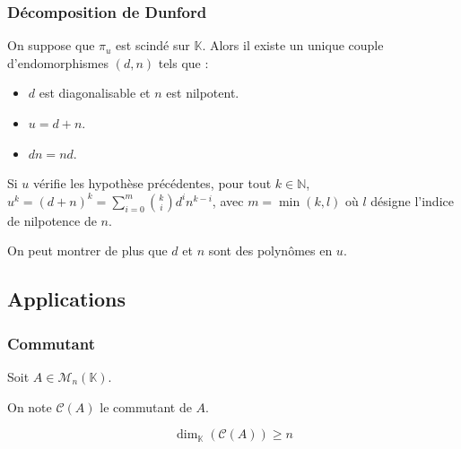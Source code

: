   \subsubsection{Décomposition de Dunford}


  \begin{theorem}
    On suppose que $\pi_u$ est scindé sur $\mathbb{K}$. Alors il existe un unique couple d'endomorphismes $(d, n)$ tels que :
    \begin{itemize}
      \item $d$ est diagonalisable et $n$ est nilpotent.
      \item $u = d + n$.
      \item $d n = n d$.
    \end{itemize}
  \end{theorem}

  \begin{corollary}
    Si $u$ vérifie les hypothèse précédentes, pour tout $k \in \mathbb{N}$, $u^k = (d + n)^k = \sum_{i=0}^m \binom{k}{i} d^i n^{k-i}$, avec $m = \min(k, l)$ où $l$ désigne l'indice de nilpotence de $n$.
  \end{corollary}

  \begin{remark}
    On peut montrer de plus que $d$ et $n$ sont des polynômes en $u$.
  \end{remark}

  \subsection{Applications}

  \subsubsection{Commutant}


  Soit $A \in \mathcal{M}_n(\mathbb{K})$.

  \begin{notation}
    On note $\mathcal{C}(A)$ le commutant de $A$.
  \end{notation}

  \begin{lemma}
    \[ \dim_{\mathbb{K}}(\mathcal{C}(A)) \geq n \]
  \end{lemma}


